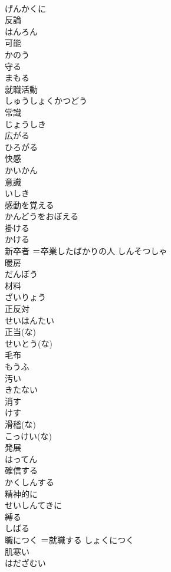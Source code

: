 \documentclass[8pt]{extreport}
\begin{document}
\begin{CJK}{UTF8}{min}
\\	げんかくに
\\	反論	
\\	はんろん
\\	可能	
\\	かのう
\\	守る	
\\	まもる
\\	就職活動	
\\	しゅうしょくかつどう
\\	常識	
\\	じょうしき
\\	広がる	
\\	ひろがる
\\	快感	
\\	かいかん
\\	意識	
\\	いしき
\\	感動を覚える	
\\	かんどうをおぼえる
\\	掛ける	
\\	かける
\\	新卒者	＝卒業したばかりの人	しんそつしゃ
\\	暖房	
\\	だんぼう
\\	材料	
\\	ざいりょう
\\	正反対	
\\	せいはんたい
\\	正当(な)	
\\	せいとう(な)
\\	毛布	
\\	もうふ
\\	汚い	
\\	きたない
\\	消す	
\\	けす
\\	滑稽(な)	
\\	こっけい(な)
\\	発展	
\\	はってん
\\	確信する	
\\	かくしんする
\\	精神的に	
\\	せいしんてきに
\\	縛る	
\\	しばる
\\	職につく	＝就職する	しょくにつく
\\	肌寒い	
\\	はだざむい

\end{CJK}
\end{document}
